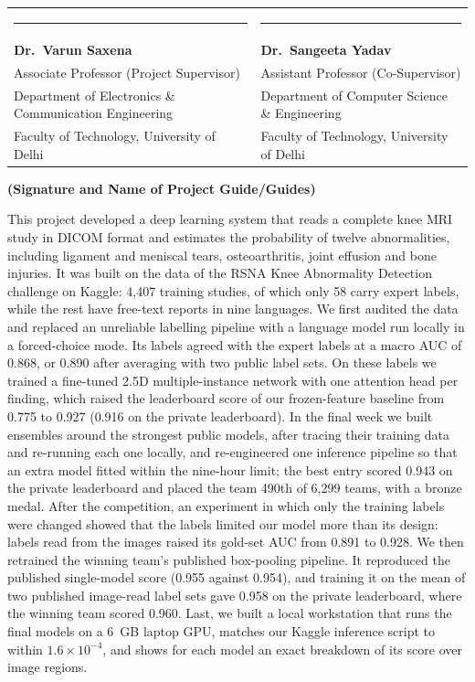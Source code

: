 \vspace{1.6cm}
{\singlespacing
\noindent\begin{tabular}{@{}>{\raggedright\arraybackslash}p{7.6cm}>{\raggedright\arraybackslash}p{7.6cm}@{}}
\rule{5.6cm}{0.4pt} & \rule{5.6cm}{0.4pt} \\
\textbf{Dr.\ Varun Saxena} & \textbf{Dr.\ Sangeeta Yadav} \\
Associate Professor (Project Supervisor) & Assistant Professor (Co-Supervisor) \\
Department of Electronics \& Communication Engineering & Department of Computer Science \& Engineering \\
Faculty of Technology, University of Delhi & Faculty of Technology, University of Delhi \\
\end{tabular}}

\begin{center}{\footnotesize\bfseries (Signature and Name of Project Guide/Guides)}\end{center}

{
This project developed a deep learning system that reads a complete knee MRI study in DICOM format and estimates the probability of twelve abnormalities, including ligament and meniscal tears, osteoarthritis, joint effusion and bone injuries. It was built on the data of the RSNA Knee Abnormality Detection challenge on Kaggle: 4,407 training studies, of which only 58 carry expert labels, while the rest have free-text reports in nine languages. We first audited the data and replaced an unreliable labelling pipeline with a language model run locally in a forced-choice mode. Its labels agreed with the expert labels at a macro AUC of 0.868, or 0.890 after averaging with two public label sets. On these labels we trained a fine-tuned 2.5D multiple-instance network with one attention head per finding, which raised the leaderboard score of our frozen-feature baseline from 0.775 to 0.927 (0.916 on the private leaderboard). In the final week we built ensembles around the strongest public models, after tracing their training data and re-running each one locally, and re-engineered one inference pipeline so that an extra model fitted within the nine-hour limit; the best entry scored 0.943 on the private leaderboard and placed the team 490th of 6,299 teams, with a bronze medal. After the competition, an experiment in which only the training labels were changed showed that the labels limited our model more than its design: labels read from the images raised its gold-set AUC from 0.891 to 0.928. We then retrained the winning team's published box-pooling pipeline. It reproduced the published single-model score (0.955 against 0.954), and training it on the mean of two published image-read label sets gave 0.958 on the private leaderboard, where the winning team scored 0.960. Last, we built a local workstation that runs the final models on a 6~GB laptop GPU, matches our Kaggle inference script to within $1.6\times10^{-4}$, and shows for each model an exact breakdown of its score over image regions.\par}

